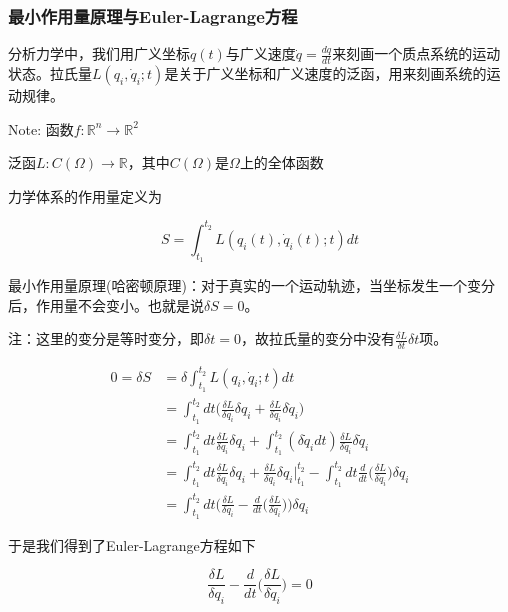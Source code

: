 \subsubsection{最小作用量原理与Euler-Lagrange方程}

分析力学中，我们用广义坐标$q(t)$与广义速度$\dot{q}=\frac{dq}{dt}$来刻画一个质点系统的运动状态。拉氏量$L(q_i,\dot{q}_i;t)$是关于广义坐标和广义速度的泛函，用来刻画系统的运动规律。

\noindent Note: 函数$f:\mathbb{R}^n\to\mathbb{R}^2$

泛函$L:C(\Omega)\to\mathbb{R}$，其中$C(\Omega)$是$\Omega$上的全体函数

力学体系的作用量定义为

\begin{equation}
    S=\int_{t_1}^{t_2}L(q_i(t),\dot{q}_i(t);t)dt
\end{equation}

最小作用量原理(哈密顿原理)：对于真实的一个运动轨迹，当坐标发生一个变分后，作用量不会变小。也就是说$\delta S=0$。

\noindent 注：这里的变分是等时变分，即$\delta t=0$，故拉氏量的变分中没有$\frac{\delta L}{\delta t}\delta t$项。

\begin{equation}
    \begin{split}
        0=\delta S &= \delta\int_{t_1}^{t_2} L(q_i,\dot{q}_i;t)dt \\
            &= \int_{t_1}^{t_2}dt \biggl(\frac{\delta L}{\delta q_i}\delta q_i+\frac{\delta L}{\delta \dot{q}_i}\delta\dot{q}_i\biggr) \\
            &= \int_{t_1}^{t_2}dt \frac{\delta L}{\delta q_i}\delta q_i + \int_{t_1}^{t_2}(\delta\dot{q}_idt)\frac{\delta L}{\delta \dot{q}_i}\delta\dot{q}_i \\
            &= \int_{t_1}^{t_2}dt \frac{\delta L}{\delta q_i}\delta q_i + \frac{\delta L}{\delta \dot{q}_i}\delta q_i|_{t_1}^{t_2} - \int_{t_1}^{t_2}dt \frac{d}{dt}\bigl(\frac{\delta L}{\delta \dot{q}_i}\bigr)\delta q_i \\
            &= \int_{t_1}^{t_2}dt \biggl(\frac{\delta L}{\delta q_i}-\frac{d}{dt}\bigl(\frac{\delta L}{\delta \dot{q}_i}\bigr)\biggr)\delta q_i
    \end{split}
\end{equation}

于是我们得到了Euler-Lagrange方程如下

\begin{equation}\label{Euler-Lagrange}
    \frac{\delta L}{\delta q_i}-\frac{d}{dt}\bigl(\frac{\delta L}{\delta \dot{q}_i}\bigr) = 0
\end{equation}


